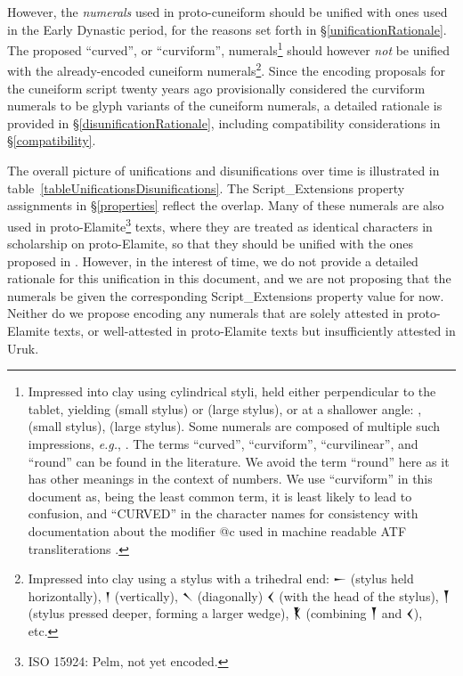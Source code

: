\documentclass[10pt, a4paper, twoside]{article}
\newcommand\oneAšC{{\proposalfont\symbol{"12550}}} %
\newcommand\oneDišC{{\proposalfont\symbol{"12559}}}
\newcommand\oneUC{{\proposalfont\symbol{"12562}}}
\newcommand\oneŊešTwoC{{\proposalfont\symbol{"1256B}}}
\newcommand\oneŊešʾuC{{\proposalfont\symbol{"12574}}}
\newcommand\oneŠarTwoC{{\proposalfont\symbol{"12579}}}
\newcommand\oneŠarʾuC{{\proposalfont\symbol{"12582}}}
\newcommand{\exempligratia}{\emph{e.g.}}
\begin{document}
However, the \emph{numerals} used in proto-cuneiform should be unified with
ones used in the Early Dynastic period, for the reasons set forth in
§\ref{unificationRationale}.
The proposed ``curved'', or ``curviform'', numerals\footnote{%
Impressed into clay using cylindrical styli,
held either perpendicular to the tablet, yielding
\oneUC{} (small stylus) or
\oneŠarTwoC{} (large stylus),
or at a shallower angle:
\oneAšC, \oneDišC{} (small stylus),
\oneŊešTwoC{} (large stylus).
Some numerals are composed of multiple such impressions,
\exempligratia, \oneŊešʾuC.
The terms ``curved'', ``curviform'', ``curvilinear'', and ``round''
can be found in the literature.
We avoid the term ``round'' here as it has other meanings
in the context of numbers.
We use ``curviform'' in this document as, being the least
common term, it is least likely to lead to confusion,
and ``CURVED'' in the character names for consistency
with documentation about the modifier @c used in machine
readable ATF transliterations \cite{inlineATF}.}
should however \emph{not} be unified with
the already-encoded cuneiform numerals\footnote{%
Impressed into clay using a stylus with a trihedral end:
{\xsuxfont 𒀸} (stylus held horizontally),
{\xsuxfont 𒁹} (vertically),
{\xsuxfont 𒀹} (diagonally)
{\xsuxfont 𒌋} (with the head of the stylus),
{\xsuxfont 𒐕} (stylus pressed deeper, forming a larger wedge),
{\xsuxfont 𒐞} (combining {\xsuxfont 𒐕} and {\xsuxfont 𒌋}), etc.}.
Since the encoding proposals for the cuneiform script
twenty years ago provisionally considered the curviform numerals
to be glyph variants of the cuneiform numerals,
a detailed rationale is provided in §\ref{disunificationRationale},
including compatibility considerations in §\ref{compatibility}.

The overall picture of unifications and disunifications over time is illustrated in table~\ref{tableUnificationsDisunifications}.
The Script\_Extensions property assignments in §\ref{properties} reflect the overlap.
Many of these numerals are also used in proto-Elamite\footnote{ISO 15924: Pelm, not yet encoded.} texts,
where they are treated as identical characters in scholarship on proto-Elamite,
so that they should be unified with the ones proposed in \cite{L2/23-196}.
However, in the interest of time, we do not provide a detailed rationale for this unification in this document,
and we are not proposing that the numerals be given the corresponding Script\_Extensions property value for now.
Neither do we propose encoding any numerals that are solely attested in proto-Elamite texts,
or well-attested in proto-Elamite texts but insufficiently attested in Uruk.
\end{document}
